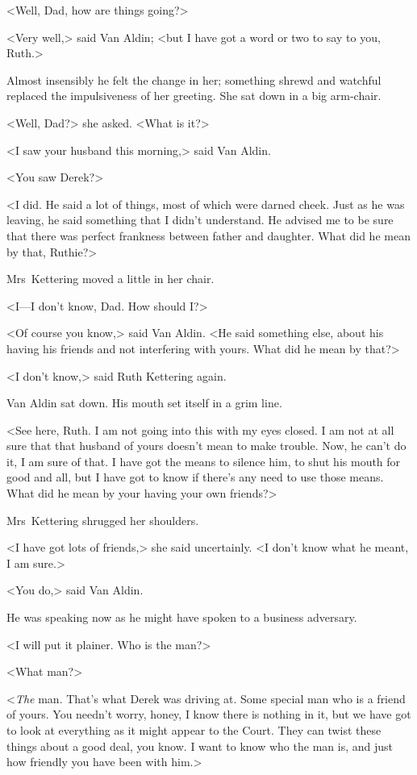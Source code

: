 <Well, Dad, how are things going?>

<Very well,> said Van Aldin; <but I have got a word or two to say to you, Ruth.>

Almost insensibly he felt the change in her; something shrewd and watchful replaced the impulsiveness of her greeting. She sat down in a big arm-chair.

<Well, Dad?> she asked. <What is it?>

<I saw your husband this morning,> said Van Aldin.

<You saw Derek?>

<I did. He said a lot of things, most of which were darned cheek. Just as he was leaving, he said something that I didn't understand. He advised me to be sure that there was perfect frankness between father and daughter. What did he mean by that, Ruthie?>

Mrs~Kettering moved a little in her chair.

<I—I don't know, Dad. How should I?>

<Of course you know,> said Van Aldin. <He said something else, about his having his friends and not interfering with yours. What did he mean by that?>

<I don't know,> said Ruth Kettering again.

Van Aldin sat down. His mouth set itself in a grim line.

<See here, Ruth. I am not going into this with my eyes closed. I am not at all sure that that husband of yours doesn't mean to make trouble. Now, he can't do it, I am sure of that. I have got the means to silence him, to shut his mouth for good and all, but I have got to know if there's any need to use those means. What did he mean by your having your own friends?>

Mrs~Kettering shrugged her shoulders.

<I have got lots of friends,> she said uncertainly. <I don't know what he meant, I am sure.>

<You do,> said Van Aldin.

He was speaking now as he might have spoken to a business adversary.

<I will put it plainer. Who is the man?>

<What man?>

<\emph{The} man. That's what Derek was driving at. Some special man who is a friend of yours. You needn't worry, honey, I know there is nothing in it, but we have got to look at everything as it might appear to the Court. They can twist these things about a good deal, you know. I want to know who the man is, and just how friendly you have been with him.>

